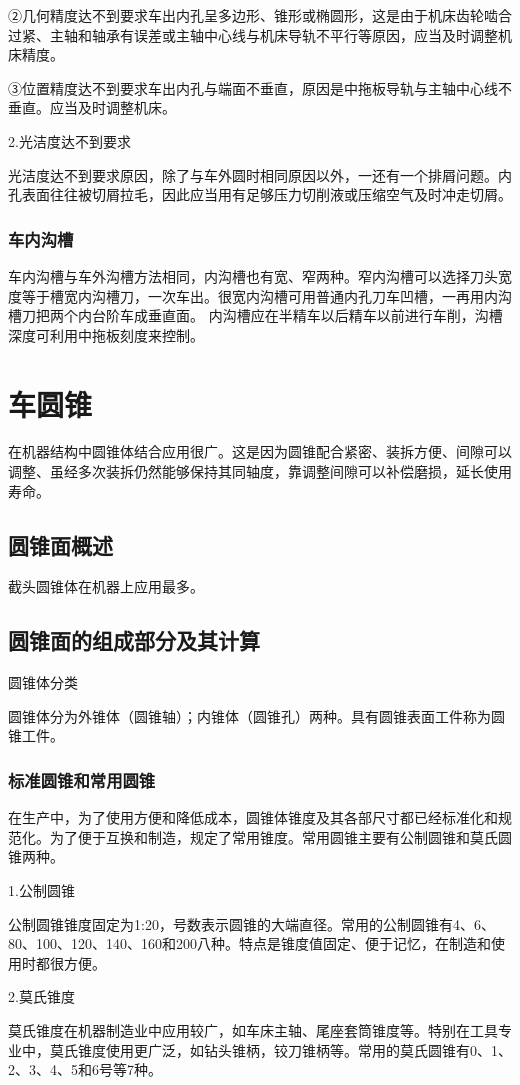 \documentclass{ctexbook}
\begin{document}
②几何精度达不到要求车出内孔呈多边形、锥形或椭圆形，这是由于机床齿轮啮合过紧、主轴和轴承有误差或主轴中心线与机床导轨不平行等原因，应当及时调整机床精度。

③位置精度达不到要求车出内孔与端面不垂直，原因是中拖板导轨与主轴中心线不垂直。应当及时调整机床。

2.光洁度达不到要求

光洁度达不到要求原因，除了与车外圆时相同原因以外，一还有一个排屑问题。内孔表面往往被切屑拉毛，因此应当用有足够压力切削液或压缩空气及时冲走切屑。
\subsubsection{车内沟槽}
车内沟槽与车外沟槽方法相同，内沟槽也有宽、窄两种。窄内沟槽可以选择刀头宽度等于槽宽内沟槽刀，一次车出。很宽内沟槽可用普通内孔刀车凹槽，一再用内沟槽刀把两个内台阶车成垂直面。
内沟槽应在半精车以后精车以前进行车削，沟槽深度可利用中拖板刻度来控制。
\section{车圆锥}
在机器结构中圆锥体结合应用很广。这是因为圆锥配合紧密、装拆方便、间隙可以调整、虽经多次装拆仍然能够保持其同轴度，靠调整间隙可以补偿磨损，延长使用寿命。
\subsection{圆锥面概述}
截头圆锥体在机器上应用最多。
\subsection{圆锥面的组成部分及其计算}
圆锥体分类

圆锥体分为外锥体（圆锥轴）；内锥体（圆锥孔）两种。具有圆锥表面工件称为圆锥工件。
\subsubsection{标准圆锥和常用圆锥}
在生产中，为了使用方便和降低成本，圆锥体锥度及其各部尺寸都已经标准化和规范化。为了便于互换和制造，规定了常用锥度。常用圆锥主要有公制圆锥和莫氏圆锥两种。

1.公制圆锥

公制圆锥锥度固定为1:20，号数表示圆锥的大端直径。常用的公制圆锥有4、6、80、100、120、140、160和200八种。特点是锥度值固定、便于记忆，在制造和使用时都很方便。

2.莫氏锥度

莫氏锥度在机器制造业中应用较广，如车床主轴、尾座套筒锥度等。特别在工具专业中，莫氏锥度使用更广泛，如钻头锥柄，铰刀锥柄等。常用的莫氏圆锥有0、1、2、3、4、5和6号等7种。
\end{document}
